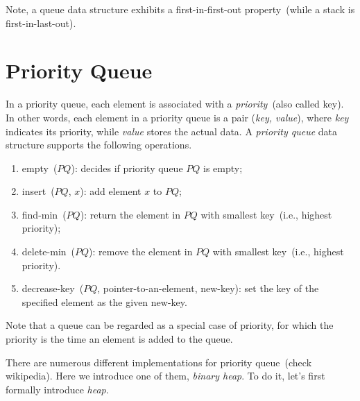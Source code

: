 \begin{minipage}{0.8\textwidth}
	\xxx
	\xxx
	\xxx
\end{minipage}

Note, a queue data structure exhibits a first-in-first-out property~(while a stack is first-in-last-out).

\section*{Priority Queue}

In a priority queue, each element is associated with a \emph{priority}~(also called key).
In other words, each element in a priority queue is a pair (\emph{key, value}),
where \emph{key} indicates its priority, while \emph{value} stores the actual data.
A \emph{priority queue} data structure supports the following operations.
\vspace*{-\topsep}
\begin{enumerate}
\item empty~($PQ$): decides if priority queue $PQ$ is empty;
\item insert~($PQ$, $x$): add element $x$ to $PQ$;
\item find-min~($PQ$): return the element in $PQ$ with smallest key~(i.e., highest priority);
\item delete-min~($PQ$): remove the element in $PQ$ with smallest key~(i.e., highest priority).
\item decrease-key~($PQ$, pointer-to-an-element, new-key): set the key of the specified element as the given new-key.
\end{enumerate}

Note that a queue can be regarded as a special case of priority, for which the priority
is the time an element is added to the queue.

There are numerous different implementations for priority queue~(check wikipedia). 
Here we introduce one of them, \emph{binary heap}. To do it, let's first
formally introduce \emph{heap}.


